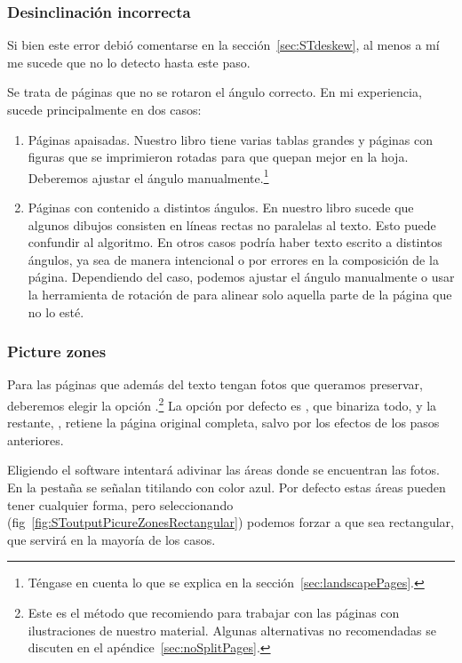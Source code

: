 \documentclass[%
	a5paper,
	10pt,
	twoside,
	openright,
	final,
]{memoir}
\begin{document}
{	\subsubsection{Desinclinación incorrecta} Si bien este error debió comentarse en la sección~\ref{sec:STdeskew}, al menos a mí me sucede que no lo detecto hasta este paso.

	Se trata de páginas que no se rotaron el ángulo correcto. En mi experiencia, sucede principalmente en dos casos:
	\begin{enumerate}
		\item Páginas apaisadas. Nuestro libro tiene varias tablas grandes y páginas con figuras que se imprimieron rotadas para que quepan mejor en la hoja. Deberemos ajustar el ángulo manualmente.\footnote{Téngase en cuenta lo que se explica en la sección~\ref{sec:landscapePages}.}
		\item Páginas con contenido a distintos ángulos. En nuestro libro sucede que algunos dibujos consisten en líneas rectas no paralelas al texto. Esto puede confundir al algoritmo. En otros casos podría haber texto escrito a distintos ángulos, ya sea de manera intencional o por errores en la composición de la página. Dependiendo del caso, podemos ajustar el ángulo manualmente o usar la herramienta de rotación de \gimp para alinear solo aquella parte de la página que no lo esté.
	\end{enumerate}

	\subsubsection{Picture zones\label{sec:SToutputPictureZones}}

	Para las páginas que además del texto tengan fotos que queramos preservar, deberemos elegir la opción .\footnote{Este es el método que recomiendo para trabajar con las páginas con ilustraciones de nuestro material. Algunas alternativas no recomendadas se discuten en el apéndice~\ref{sec:noSplitPages}.} La opción por defecto es , que binariza todo, y la restante, , retiene la página original completa, salvo por los efectos de los pasos anteriores.

	Eligiendo  el software intentará adivinar las áreas donde se encuentran las fotos. En la pestaña  se señalan titilando con color azul. Por defecto estas áreas pueden tener cualquier forma, pero seleccionando  (fig~\ref{fig:SToutputPicureZonesRectangular}) podemos forzar a que sea rectangular, que servirá en la mayoría de los casos.

}
\end{document}
